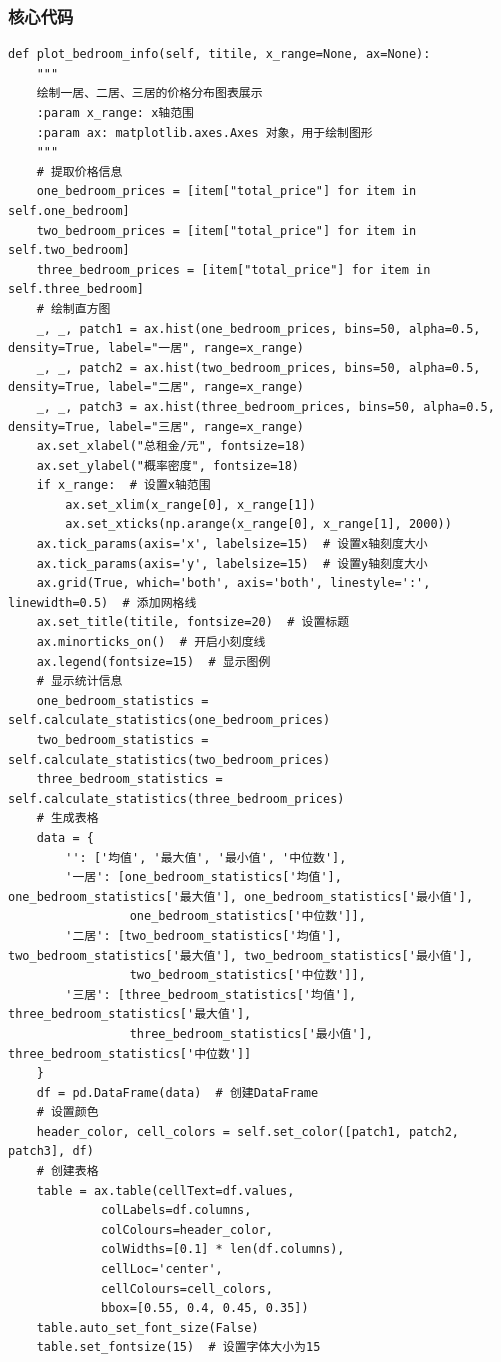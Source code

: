 \documentclass[lang=cn,11pt,a4paper]{elegantpaper}
\begin{document}
\subsubsection{核心代码}
\begin{lstlisting}
def plot_bedroom_info(self, titile, x_range=None, ax=None):
    """
    绘制一居、二居、三居的价格分布图表展示
    :param x_range: x轴范围
    :param ax: matplotlib.axes.Axes 对象，用于绘制图形
    """
    # 提取价格信息
    one_bedroom_prices = [item["total_price"] for item in self.one_bedroom]
    two_bedroom_prices = [item["total_price"] for item in self.two_bedroom]
    three_bedroom_prices = [item["total_price"] for item in self.three_bedroom]
    # 绘制直方图
    _, _, patch1 = ax.hist(one_bedroom_prices, bins=50, alpha=0.5, density=True, label="一居", range=x_range)
    _, _, patch2 = ax.hist(two_bedroom_prices, bins=50, alpha=0.5, density=True, label="二居", range=x_range)
    _, _, patch3 = ax.hist(three_bedroom_prices, bins=50, alpha=0.5, density=True, label="三居", range=x_range)
    ax.set_xlabel("总租金/元", fontsize=18)
    ax.set_ylabel("概率密度", fontsize=18)
    if x_range:  # 设置x轴范围
        ax.set_xlim(x_range[0], x_range[1])
        ax.set_xticks(np.arange(x_range[0], x_range[1], 2000))
    ax.tick_params(axis='x', labelsize=15)  # 设置x轴刻度大小
    ax.tick_params(axis='y', labelsize=15)  # 设置y轴刻度大小
    ax.grid(True, which='both', axis='both', linestyle=':', linewidth=0.5)  # 添加网格线
    ax.set_title(titile, fontsize=20)  # 设置标题
    ax.minorticks_on()  # 开启小刻度线
    ax.legend(fontsize=15)  # 显示图例
    # 显示统计信息
    one_bedroom_statistics = self.calculate_statistics(one_bedroom_prices)
    two_bedroom_statistics = self.calculate_statistics(two_bedroom_prices)
    three_bedroom_statistics = self.calculate_statistics(three_bedroom_prices)
    # 生成表格
    data = {
        '': ['均值', '最大值', '最小值', '中位数'],
        '一居': [one_bedroom_statistics['均值'], one_bedroom_statistics['最大值'], one_bedroom_statistics['最小值'],
                 one_bedroom_statistics['中位数']],
        '二居': [two_bedroom_statistics['均值'], two_bedroom_statistics['最大值'], two_bedroom_statistics['最小值'],
                 two_bedroom_statistics['中位数']],
        '三居': [three_bedroom_statistics['均值'], three_bedroom_statistics['最大值'],
                 three_bedroom_statistics['最小值'], three_bedroom_statistics['中位数']]
    }
    df = pd.DataFrame(data)  # 创建DataFrame
    # 设置颜色
    header_color, cell_colors = self.set_color([patch1, patch2, patch3], df)
    # 创建表格
    table = ax.table(cellText=df.values,
             colLabels=df.columns,
             colColours=header_color,
             colWidths=[0.1] * len(df.columns),
             cellLoc='center',
             cellColours=cell_colors,
             bbox=[0.55, 0.4, 0.45, 0.35])
    table.auto_set_font_size(False)
    table.set_fontsize(15)  # 设置字体大小为15
\end{lstlisting}
\end{document}
